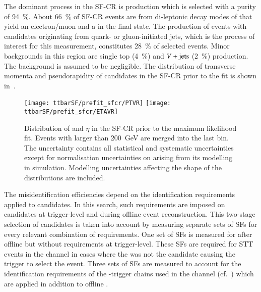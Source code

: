 The dominant process in the SF-CR is \ttbar production which is selected with a
purity of \SI{94}{\percent}. About \SI{66}{\percent} of SF-CR events are from
di-leptonic decay modes of \ttbar that yield an electron/muon and a \tauhadvis
in the final state. The production of \ttbar events with \tauhadvis candidates
originating from quark- or gluon-initiated jets, which is the process of
interest for this measurement, constitutes \SI{28}{\percent} of selected
events. Minor backgrounds in this region are single top (\SI{4}{\percent}) and
$V+\text{jets}$ (\SI{2}{\percent}) production. The \multijet background is assumed to
be negligible. The distribution of transverse momenta and pseudorapidity of
\tauhadvis candidates in the SF-CR prior to the fit is shown
in~.

\begin{figure}[htbp]
  \centering

  \texttt{[image: ttbarSF/prefit\_sfcr/PTVR]}%
  \texttt{[image: ttbarSF/prefit\_sfcr/ETAVR]}

  \caption{Distribution of \tauhadvis \pT and $\eta$ in the SF-CR prior to the
    maximum likelihood fit. Events with \tauhadvis \pT larger than
    \SI{200}{\GeV} are merged into the last bin. The uncertainty contains all
    statistical and systematic uncertainties except for normalisation
    uncertainties on \ttbar arising from its modelling in simulation. Modelling
    uncertainties affecting the shape of the distributions are included.}%
  \label{fig:ttbarSF_prefit_pt}
\end{figure}

The \jettotauhadvis misidentification efficiencies depend on the identification
requirements applied to \tauhadvis candidates. In this search, such requirements
are imposed on \tauhadvis candidates at trigger-level and during offline event
reconstruction. This two-stage selection of \tauhadvis candidates is taken into
account by measuring separate sets of SFs for every relevant combination of
\tauid requirements. One set of SFs is measured for \faketauhadvis after offline
\tauid but without requirements at trigger-level. These SFs are required for STT
events in the \hadhad channel in cases where the \faketauhadvis was not the
candidate causing the trigger to select the event. Three sets of SFs are
measured to account for the identification requirements of the
\tauhadvis-trigger chains used in the \hadhad channel
(cf.~) which are applied in addition to
offline \tauid.

